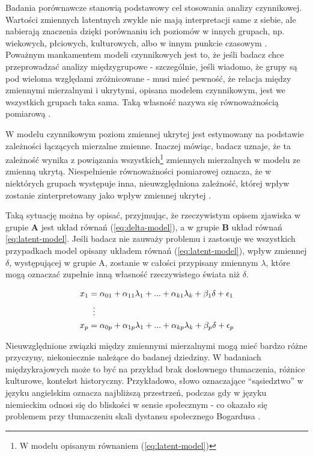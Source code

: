 \documentclass[12pt]{article}
\begin{document}
Badania porównawcze stanowią podstawowy cel stosowania analizy czynnikowej. Wartości zmiennych latentnych zwykle nie mają interpretacji same z siebie, ale nabierają znaczenia dzięki porównaniu ich poziomów w innych grupach, np. wiekowych, płciowych, kulturowych, albo w innym punkcie czasowym \citep{Pokropek}. Poważnym mankamentem modeli czynnikowych jest to, że jeśli badacz chce przeprowadzać analizy międzygrupowe - szczególnie, jeśli wiadomo, że grupy są pod wieloma względami zróżnicowane - musi mieć pewność, że relacja między zmiennymi mierzalnymi i ukrytymi, opisana modelem czynnikowym, jest we wszystkich grupach taka sama. Taką własność nazywa się równoważnością pomiarową \citep{ChenEtAl}.

W modelu czynnikowym poziom zmiennej ukrytej jest estymowany na podstawie zależności łączących mierzalne zmienne. Inaczej mówiąc, badacz uznaje, że ta zależność wynika z powiązania wszystkich\footnote{W modelu opisanym równaniem (\ref{eq:latent-model})} zmiennych mierzalnych w modelu ze zmienną ukrytą. Niespełnienie równoważności pomiarowej oznacza, że w niektórych grupach występuje inna, nieuwzględniona zależność, której wpływ zostanie zinterpretowany jako wpływ zmiennej ukrytej \citep{HirBra}.

Taką sytuację można by opisać, przyjmując, że rzeczywistym opisem zjawiska w grupie \textbf{A} jest układ równań (\ref{eq:delta-model}), a w grupie \textbf{B} układ równań \ref{eq:latent-model}. Jeśli badacz nie zauważy problemu i zastosuje we wszystkich przypadkach model opisany układem równań (\ref{eq:latent-model}), wpływ zmiennej \(\delta\), występującej w grupie A, zostanie w całości przypisany zmiennym \(\lambda\), które mogą oznaczać zupełnie inną własność rzeczywistego świata niż \(\delta\).

\begin{align}
\label{eq:delta-model}
\begin{split}
x_1 &= \alpha_{01} + \alpha_{11} \lambda_1 + ... + \alpha_{k1} \lambda_k + \beta_1 \delta + \epsilon_1 \\
& \vdotswithin{=} \\
x_p &= \alpha_{0p} + \alpha_{1p} \lambda_1 + ... + \alpha_{kp} \lambda_k + \beta_p \delta + \epsilon_p \\
\end{split}
\end{align}

Nieuwzględnione związki między zmiennymi mierzalnymi mogą mieć bardzo różne przyczyny, niekoniecznie należące do badanej dziedziny. W badaniach międzykrajowych może to być na przykład brak dosłownego tłumaczenia, różnice kulturowe, kontekst historyczny. Przykładowo, słowo oznaczające ``sąsiedztwo'' w języku angielskim oznacza najbliższą przestrzeń, podczas gdy w języku niemieckim odnosi się do bliskości w sensie społecznym - co okazało się problemem przy tłumaczeniu skali dystansu społecznego Bogardusa \citep{Pokropek}.
\end{document}
